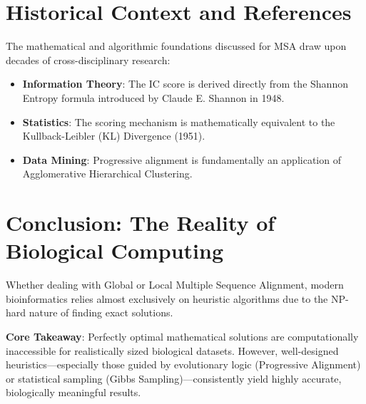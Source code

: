 \section{Historical Context and References}
The mathematical and algorithmic foundations discussed for MSA draw upon decades of cross-disciplinary research:
\begin{itemize}
    \item \textbf{Information Theory}: The IC score is derived directly from the Shannon Entropy formula introduced by Claude E. Shannon in 1948.
    \item \textbf{Statistics}: The scoring mechanism is mathematically equivalent to the Kullback-Leibler (KL) Divergence (1951).
    \item \textbf{Data Mining}: Progressive alignment is fundamentally an application of Agglomerative Hierarchical Clustering.
\end{itemize}

\section{Conclusion: The Reality of Biological Computing}
Whether dealing with Global or Local Multiple Sequence Alignment, modern bioinformatics relies almost exclusively on heuristic algorithms due to the NP-hard nature of finding exact solutions.
\begin{important}
    \textbf{Core Takeaway}: Perfectly optimal mathematical solutions are computationally inaccessible for realistically sized biological datasets. However, well-designed heuristics—especially those guided by evolutionary logic (Progressive Alignment) or statistical sampling (Gibbs Sampling)—consistently yield highly accurate, biologically meaningful results.
\end{important}


